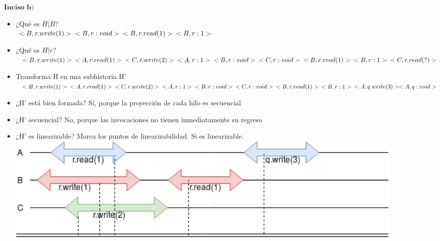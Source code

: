 \documentclass[12pt, letterpaper]{article}
\begin{document}
\begin{itemize}
$\textbf{Inciso b)}$
\begin{itemize}
\item ¿Qué es $H|B$?\\
$
<B, r.write(1)>\\
<B, r:void>\\
<B, r.read(1)>\\
<B, r:1>\\
$
\item ¿Qué es $H|r$?
$
<B, r.write(1)>\\
<A, r.read(1)>\\
<C, r.write(2)>\\
<A, r: 1>\\
<B, r:void>\\
<C, r:void>\\
<B, r.read(1)>\\
<B, r:1>\\
<C, r.read(?)>
$
\item Transforma H en una subhistoria H'
$
<B, r.write(1)>\\
<A, r.read(1)>\\
<C, r.write(2)>\\
<A, r: 1>\\
<B, r:void>\\
<C, r:void>\\
<B, r.read(1)>\\
<B, r:1>\\
<A, q.write(3)>
<A, q:void>
$
\item ¿H' está bien formada?
Sí, porque la proyección de cada hilo es secuencial
\item ¿H' secuencial?
No, porque las invocaciones no tienen inmediatamente su regreso
\item ¿H' es linearizable? Marca los puntos de linearizabilidad.
Si es linearizable.
\includegraphics[width=0.9\textwidth]{1b_linearizable.png}\\


\end{itemize}
\end{itemize}
\end{document}
